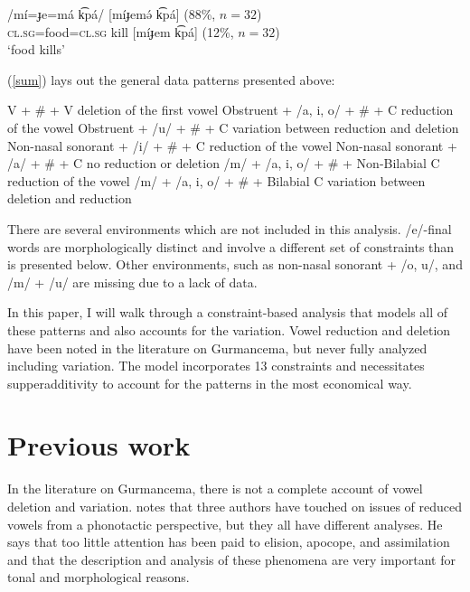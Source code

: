 \documentclass[output=paper,newtxmath,modfonts,nonflat,draftmode]{langsci/langscibook}
\begin{document}
\ex
\gll /mí=ɟe=má k͡pá/ \hspace{.5cm} [míɟemə́ k͡pá] (88\%, $n=32$)\\
\textsc{cl.sg}=food=\textsc{cl.sg} kill \hspace{0.5cm} [míɟem k͡pá] (12\%, $n=32$)\\
\glt `food kills'
\z
\z

(\ref{sum}) lays out the general data patterns presented above:

\ea \label{sum}

V + \# + V \hfill deletion of the first vowel \newline
Obstruent + /a, i, o/ + \# + C \hfill reduction of the vowel\newline
Obstruent + /u/ + \# + C \hfill variation between reduction and deletion\newline
Non-nasal sonorant + /i/ + \# + C \hfill reduction of the vowel\newline
Non-nasal sonorant + /a/ + \# + C \hfill no reduction or deletion\newline
/m/ + /a, i, o/ + \# + Non-Bilabial C \hfill reduction of the vowel\newline
/m/ + /a, i, o/ + \# + Bilabial C \hfill variation between deletion and reduction\newline

\z

There are several environments which are not included in this analysis. /e/-final words are morphologically distinct and involve a different set of constraints than is presented below. Other environments, such as non-nasal sonorant + /o, u/, and /m/ + /u/ are missing due to a lack of data. 

In this paper, I will walk through a constraint-based analysis that models all of these patterns and also accounts for the variation. Vowel reduction and deletion have been noted in the literature on Gurmancema, but never fully analyzed including variation. The model incorporates 13 constraints and necessitates supperadditivity \citep{AlbrightMagri2008,GreenDavis2014} to account for the patterns in the most economical way. 



\section{Previous work} \label{sec:baird:3}

In the literature on Gurmancema, there is not a complete account of vowel deletion and variation. \citet{Naba1994} notes that three authors have touched on issues of reduced vowels from a phonotactic perspective, but they all have different analyses. He says that too little attention has been paid to elision, apocope, and assimilation and that the description and analysis of these phenomena are very important for tonal and morphological reasons.
\end{document}

